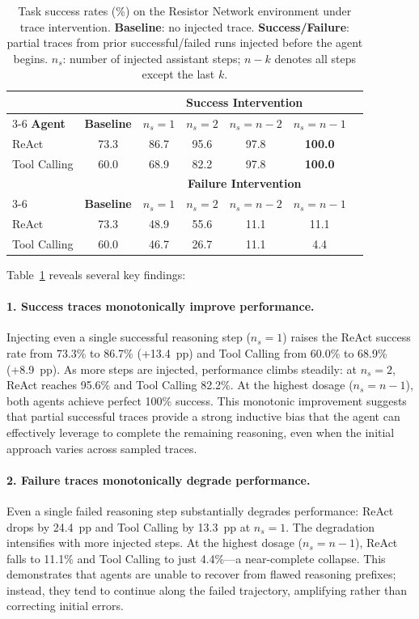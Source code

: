 \begin{table}[t]
\centering
\caption{Task success rates (\%) on the Resistor Network environment under trace intervention. \textbf{Baseline}: no injected trace. \textbf{Success/Failure}: partial traces from prior successful/failed runs injected before the agent begins. $n_s$: number of injected assistant steps; $n{-}k$ denotes all steps except the last $k$.}
\label{tab:intervention-resistor}
\small
\begin{tabular}{lcccccc}
\toprule
 & & \multicolumn{4}{c}{\textbf{Success Intervention}} \\
\cmidrule(lr){3-6}
\textbf{Agent} & \textbf{Baseline} & $n_s{=}1$ & $n_s{=}2$ & $n_s{=}n{-}2$ & $n_s{=}n{-}1$ \\
\midrule
ReAct         & 73.3 & 86.7 & 95.6 & 97.8 & \textbf{100.0} \\
Tool Calling  & 60.0 & 68.9 & 82.2 & 97.8 & \textbf{100.0} \\
\midrule
 & & \multicolumn{4}{c}{\textbf{Failure Intervention}} \\
\cmidrule(lr){3-6}
 & \textbf{Baseline} & $n_s{=}1$ & $n_s{=}2$ & $n_s{=}n{-}2$ & $n_s{=}n{-}1$ \\
\midrule
ReAct         & 73.3 & 48.9 & 55.6 & 11.1 & 11.1 \\
Tool Calling  & 60.0 & 46.7 & 26.7 & 11.1 &  4.4 \\
\bottomrule
\end{tabular}
\end{table}

Table~\ref{tab:intervention-resistor} reveals several key findings:

\paragraph{1. Success traces monotonically improve performance.}
Injecting even a single successful reasoning step ($n_s{=}1$) raises the ReAct success rate from 73.3\% to 86.7\% (+13.4~pp) and Tool Calling from 60.0\% to 68.9\% (+8.9~pp).
As more steps are injected, performance climbs steadily: at $n_s{=}2$, ReAct reaches 95.6\% and Tool Calling 82.2\%.
At the highest dosage ($n_s{=}n{-}1$), both agents achieve perfect 100\% success.
This monotonic improvement suggests that partial successful traces provide a strong inductive bias that the agent can effectively leverage to complete the remaining reasoning, even when the initial approach varies across sampled traces.

\paragraph{2. Failure traces monotonically degrade performance.}
Even a single failed reasoning step substantially degrades performance: ReAct drops by 24.4~pp and Tool Calling by 13.3~pp at $n_s{=}1$.
The degradation intensifies with more injected steps.
At the highest dosage ($n_s{=}n{-}1$), ReAct falls to 11.1\% and Tool Calling to just 4.4\%---a near-complete collapse.
This demonstrates that agents are unable to recover from flawed reasoning prefixes; instead, they tend to continue along the failed trajectory, amplifying rather than correcting initial errors.

